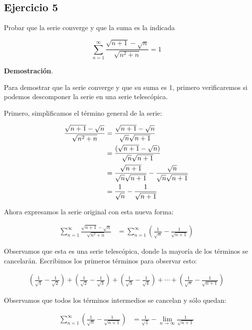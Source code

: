 \documentclass{article}
\begin{document}
    \subsection*{Ejercicio 5}

    Probar que la serie converge y que la suma es la indicada

    $$
    \sum_{n=1}^{\infty} \frac{\sqrt{n+1}-\sqrt{n}}{\sqrt{n^{2}+n}}=1
    $$

    \textbf{Demostración}.

    Para demostrar que la serie converge y que su suma es 1, primero verificaremos si podemos descomponer la serie en una serie telescópica.

    Primero, simplificamos el término general de la serie:

    \begin{align*}
    \frac{\sqrt{n+1}-\sqrt{n}}{\sqrt{n^{2}+n}} &= \frac{\sqrt{n+1}-\sqrt{n}}{\sqrt{n} \sqrt{n+1}} \notag \\
    &= \frac{(\sqrt{n+1}-\sqrt{n})}{\sqrt{n} \sqrt{n+1}} \notag \\
    &= \frac{\sqrt{n+1}}{\sqrt{n} \sqrt{n+1}} - \frac{\sqrt{n}}{\sqrt{n} \sqrt{n+1}} \notag \\
    &= \frac{1}{\sqrt{n}} - \frac{1}{\sqrt{n+1}}
    \end{align*}

    Ahora expresamos la serie original con esta nueva forma:

    \begin{align*}
    \sum_{n=1}^{\infty} \frac{\sqrt{n+1}-\sqrt{n}}{\sqrt{n^{2}+n}} &= \sum_{n=1}^{\infty} \left(\frac{1}{\sqrt{n}} - \frac{1}{\sqrt{n+1}}\right)
    \end{align*}

    Observamos que esta es una serie telescópica, donde la mayoría de los términos se cancelarán.
    Escribimos los primeros términos para observar esto:

    \begin{align*}
    \left(\frac{1}{\sqrt{1}} - \frac{1}{\sqrt{2}}\right)
    + \left(\frac{1}{\sqrt{2}} - \frac{1}{\sqrt{3}}\right)
    + \left(\frac{1}{\sqrt{3}} - \frac{1}{\sqrt{4}}\right)
    + \cdots
    + \left(\frac{1}{\sqrt{n}} - \frac{1}{\sqrt{n+1}}\right)
    \end{align*}

    Observamos que todos los términos intermedios se cancelan y sólo quedan:

    \begin{align*}
    \sum_{n=1}^{\infty} \left(\frac{1}{\sqrt{n}} - \frac{1}{\sqrt{n+1}}\right)
    &= \frac{1}{\sqrt{1}} - \lim_{n \to \infty} \frac{1}{\sqrt{n+1}}
    \end{align*}
\end{document}
